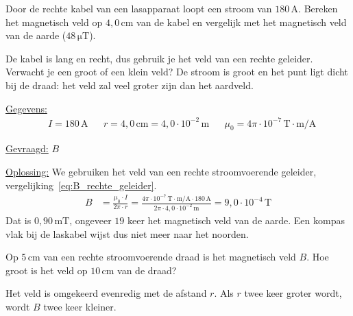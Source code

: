 \documentclass{ximera}
\begin{document}
\begin{example}[foldable=true,title={Magnetisch veld bij een laskabel}]\nl
    Door de rechte kabel van een lasapparaat loopt een stroom van $180\,\mathrm{A}$. Bereken het magnetisch veld op $4{,}0\,\mathrm{cm}$ van de kabel en vergelijk met het magnetisch veld van de aarde ($48\,\mathrm{\mu T}$).

    \begin{remark}[title={Denkstap}]\nl
        De kabel is lang en recht, dus gebruik je het veld van een rechte geleider. Verwacht je een groot of een klein veld? De stroom is groot en het punt ligt dicht bij de draad: het veld zal veel groter zijn dan het aardveld.
    \end{remark}

    \begin{solution}\nl
        \underline{Gegevens:}
        \begin{align*}
            & I = 180\,\mathrm{A} & & r = 4{,}0\,\mathrm{cm} = 4{,}0 \cdot 10^{-2}\,\mathrm{m} & & \mu_0 = 4\pi \cdot 10^{-7}\,\mathrm{T\cdot m/A}
        \end{align*}

        \underline{Gevraagd:} $B$

        \underline{Oplossing:} We gebruiken het veld van een rechte stroomvoerende geleider, vergelijking~\eqref{eq:B_rechte_geleider}.
        \begin{align*}
            B &= \frac{\mu_0 \cdot I}{2\pi \cdot r} = \frac{4\pi \cdot 10^{-7}\,\mathrm{T\cdot m/A} \cdot 180\,\mathrm{A}}{2\pi \cdot 4{,}0 \cdot 10^{-2}\,\mathrm{m}} = \boxed{9{,}0 \cdot 10^{-4}\,\mathrm{T}}
        \end{align*}
        Dat is $0{,}90\,\mathrm{mT}$, ongeveer $19$ keer het magnetisch veld van de aarde. Een kompas vlak bij de laskabel wijst dus niet meer naar het noorden.
    \end{solution}
\end{example}

\begin{question}
    Op $5\,\mathrm{cm}$ van een rechte stroomvoerende draad is het magnetisch veld $B$. Hoe groot is het veld op $10\,\mathrm{cm}$ van de draad?

    \begin{multipleChoice}
    \end{multipleChoice}

    \begin{solution}\nl
        Het veld is omgekeerd evenredig met de afstand $r$. Als $r$ twee keer groter wordt, wordt $B$ twee keer kleiner.
    \end{solution}
\end{question}
\end{document}
